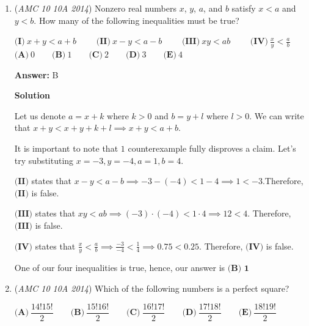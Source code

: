 \begin{enumerate}
 From the first part of the problem, we know that $a$ cows produce $b$ gallons of milk in $c$ days. Substituting $n = a$, $W = b$, and $t = c$ into our formula gives:$b = a \cdot c \cdot r \implies r = \frac{b}{ac}$

 And just like that, we can continue by using the ways from the previous solutions to find the answer $\boxed{\textbf{(A)}}$.

 \begin{verbatim}
\href{https://youtu.be/4THtSkiSGMg}{https://youtu.be/4THtSkiSGMg}
\end{verbatim}




	\item (\textit{AMC 10 10A 2014}) Nonzero real numbers $x$, $y$, $a$, and $b$ satisfy $x < a$ and $y < b$. How many of the following inequalities must be true?


 $\textbf{(I)}\ x+y < a+b\qquad$
$\textbf{(II)}\ x-y < a-b\qquad$
$\textbf{(III)}\ xy < ab\qquad$
$\textbf{(IV)}\ \frac{x}{y} < \frac{a}{b}$
$\textbf{(A)}\ 0\qquad\textbf{(B)}\ 1\qquad\textbf{(C)}\ 2\qquad\textbf{(D)}\ 3\qquad\textbf{(E)}\ 4$

 \textbf{Answer: }B



\textbf{Solution}

Let us denote $a = x + k$ where $k > 0$ and $b = y + l$ where $l > 0$. We can write that $x + y < x + y + k + l \implies x + y < a + b$.

 It is important to note that $1$ counterexample fully disproves a claim. Let's try substituting $x=-3,y=-4,a=1,b=4$.

 
$\textbf{(II)}$ states that $x-y<a-b \implies -3 - (-4) < 1 - 4  \implies 1 < -3$.Therefore, $\textbf{(II)}$ is false.

 $\textbf{(III)}$ states that $xy<ab \implies (-3) \cdot (-4) < 1 \cdot 4 \implies 12 < 4$. Therefore, $\textbf{(III)}$ is false.

 $\textbf{(IV)}$ states that $\frac{x}{y}<\frac{a}{b} \implies \frac{-3}{-4} < \frac{1}{4} \implies 0.75 < 0.25$. Therefore, $\textbf{(IV)}$ is false.

 
One of our four inequalities is true, hence, our answer is $\boxed{\textbf{(B) 1}}$



	\item (\textit{AMC 10 10A 2014}) Which of the following numbers is a perfect square?


 $\textbf{(A)}\ \dfrac{14!15!}2\qquad\textbf{(B)}\ \dfrac{15!16!}2\qquad\textbf{(C)}\ \dfrac{16!17!}2\qquad\textbf{(D)}\ \dfrac{17!18!}2\qquad\textbf{(E)}\ \dfrac{18!19!}2$


\end{enumerate}
